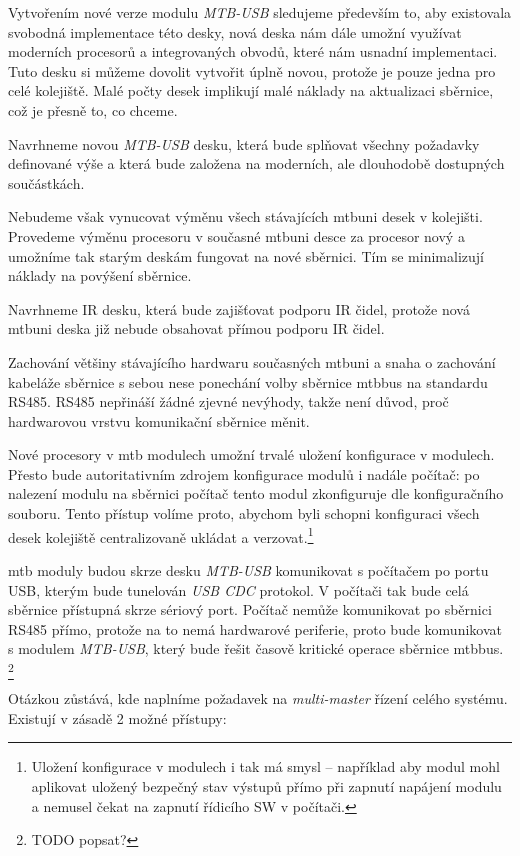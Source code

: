 Vytvořením nové verze modulu \textit{MTB-USB} sledujeme především to, aby
existovala svobodná implementace této desky, nová deska nám dále umožní využívat
moderních procesorů a integrovaných obvodů, které nám usnadní implementaci.
Tuto desku si můžeme dovolit vytvořit úplně novou, protože je pouze jedna
pro celé kolejiště. Malé počty desek implikují malé náklady na aktualizaci
sběrnice, což je přesně to, co chceme.

Navrhneme novou \textit{MTB-USB} desku, která bude splňovat všechny požadavky
definované výše a která bude založena na moderních, ale dlouhodobě dostupných
součástkách.

Nebudeme však vynucovat výměnu všech stávajících \gls{mtbuni} desek v
kolejišti. Provedeme výměnu procesoru v současné \gls{mtbuni} desce za
procesor nový a umožníme tak starým deskám fungovat na nové sběrnici. Tím se
minimalizují náklady na povýšení sběrnice.

Navrhneme IR desku, která bude zajišťovat podporu IR čidel, protože nová
\gls{mtbuni} deska již nebude obsahovat přímou podporu IR čidel.

Zachování většiny stávajícího hardwaru současných \gls{mtbuni} a snaha o
zachování kabeláže sběrnice s sebou nese ponechání volby sběrnice \gls{mtbbus}
na standardu RS485. RS485 nepřináší žádné zjevné nevýhody, takže není důvod,
proč hardwarovou vrstvu komunikační sběrnice měnit.

Nové procesory v \gls{mtb} modulech umožní trvalé uložení konfigurace v modulech.
Přesto bude autoritativním zdrojem konfigurace modulů i nadále počítač: po
nalezení modulu na sběrnici počítač tento modul zkonfiguruje dle konfiguračního
souboru. Tento přístup volíme proto, abychom byli schopni konfiguraci všech
desek kolejiště centralizovaně ukládat a verzovat.\footnote{Uložení konfigurace
v modulech i tak má smysl – například aby modul mohl aplikovat uložený bezpečný
stav výstupů přímo při zapnutí napájení modulu a nemusel čekat na zapnutí
řídicího SW v počítači.}

\gls{mtb} moduly budou skrze desku \textit{MTB-USB} komunikovat s počítačem
po portu USB, kterým bude tunelován \textit{USB CDC} protokol. V počítači tak
bude celá sběrnice přístupná skrze sériový port. Počítač nemůže komunikovat
po sběrnici RS485 přímo, protože na to nemá hardwarové periferie, proto bude
komunikovat s modulem \textit{MTB-USB}, který bude řešit časově kritické operace
sběrnice \gls{mtbbus}. \footnote{TODO popsat?}

Otázkou zůstává, kde naplníme požadavek na \textit{multi-master} řízení celého
systému. Existují v zásadě 2 možné přístupy:

